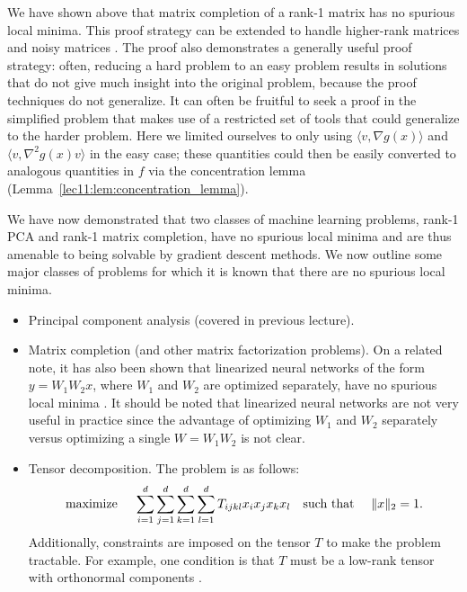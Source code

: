 We have shown above that matrix completion of a rank-1 matrix has no spurious local minima. This proof strategy can be extended to handle higher-rank matrices and noisy matrices \cite{ge2016}. The proof also demonstrates a generally useful proof strategy: often, reducing a hard problem to an easy problem results in solutions that do not give much insight into the original problem, because the proof techniques do not generalize. It can often be fruitful to seek a proof in the simplified problem that makes use of a restricted set of tools that could generalize to the harder problem. Here we limited ourselves to only using $\langle v, \nabla g(x)\rangle$ and $\langle v, \nabla^2 g(x) v\rangle$ in the easy case; these quantities could then be easily converted to analogous quantities in $f$ via the concentration lemma (Lemma~\ref{lec11:lem:concentration_lemma}).

We have now demonstrated that two classes of machine learning problems, rank-1 PCA and rank-1 matrix completion, have no spurious local minima and are thus amenable to being solvable by gradient descent methods. We now outline some major classes of problems for which it is known that there are no spurious local minima.

\begin{itemize}
    \item Principal component analysis (covered in previous lecture).
    \item Matrix completion (and other matrix factorization problems). On a related note, it has also been shown that linearized neural networks of the form $y = W_1W_2x$, where $W_1$ and $W_2$ are optimized separately, have no spurious local minima \cite{baldi1989neural}. It should be noted that linearized neural networks are not very useful in practice since the advantage of optimizing $W_1$ and $W_2$ separately versus optimizing a single $W=W_1W_2$ is not clear.
    \item Tensor decomposition. The problem is as follows:
    \begin{align}
        \text{maximize }\quad \sum_{i=1}^d \sum_{j=1}^d \sum_{k=1}^d \sum_{l=1}^d T_{ijkl} x_ix_jx_kx_l \quad \text{such that } \quad \|x\|_2 = 1.
    \end{align}
    Additionally, constraints are imposed on the tensor $T$ to make the problem tractable. For example, one condition is that $T$ must be a low-rank tensor with orthonormal components \cite{ge2015}.
\end{itemize}